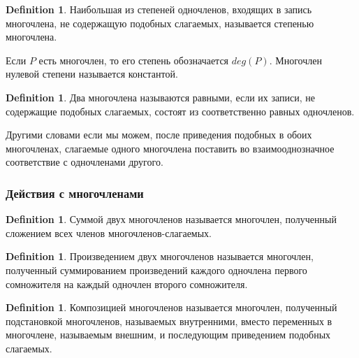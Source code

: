\documentclass[letterpaper, 10pt]{article}
\theoremstyle{definition}
\newtheorem{define}[thm]{Definition}
\begin{document}
\begin{define}
Наибольшая из степеней одночленов, входящих в запись многочлена, не содержащую
подобных слагаемых, называется степенью многочлена.
\end{define}

Если $P$ есть многочлен, то его степень обозначается $deg(P)$.
Многочлен нулевой степени называется константой.

\begin{define}
Два многочлена называются равными, если их записи, не содержащие подобных
слагаемых, состоят из соответственно равных одночленов.
\end{define}

Другими словами если мы можем, после приведения подобных в обоих многочленах,
слагаемые одного многочлена поставить во взаимооднозначное соответствие с
одночленами другого.

\subsubsection{Действия с многочленами}

\begin{define}
Суммой двух многочленов называется многочлен, полученный сложением всех членов
многочленов-слагаемых.
\end{define}

\begin{define}
Произведением двух многочленов называется многочлен, полученный суммированием
произведений каждого одночлена первого сомножителя на каждый одночлен второго
сомножителя.
\end{define}

\begin{define}
Композицией многочленов называется многочлен, полученный подстановкой
многочленов, называемых внутренними, вместо переменных в многочлене, называемым
внешним, и последующим приведением подобных слагаемых.
\end{define}
\end{document}
